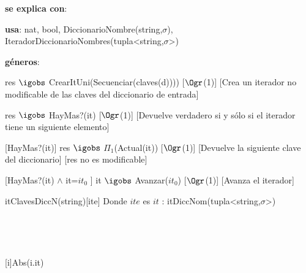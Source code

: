 \begin{Interfaz}

	\textbf{se explica con}: 
	
	\textbf{usa}: nat, bool, DiccionarioNombre(string,$\sigma$), IteradorDiccionarioNombres(tupla<string,$\sigma$>)
	
	\textbf{géneros}: 
	

	{res $\igobs$ CrearItUni(Secuenciar(claves(d))))}
	[$\Ogr$(1)]
	[Crea un iterador no modificable de las claves del diccionario  de entrada]
	
	
	{res $\igobs$ HayMas?(it)}
	[$\Ogr$(1)]
	[Devuelve verdadero si y sólo si el iterador tiene un siguiente elemento]
	
	[HayMas?(it)]
	{res $\igobs$ $\Pi_1$(Actual(it))}
	[$\Ogr$(1)]
	[Devuelve la siguiente clave del diccionario]
	[res no es modificable]
	
	[HayMas?(it) $\land$ it=$it_0$ ]
	{it $\igobs$ Avanzar($it_0$)}
	[$\Ogr$(1)]
	[Avanza el iterador]
	
	
\end{Interfaz}

\begin{Representacion}

	\begin{Estructura}{itClavesDiccN(string)}[ite]
		Donde $ite$ es $it$ : itDiccNom(tupla<string,$\sigma$>)
	\end{Estructura}
	
~
	
	
~

	{Abs(i.it)}
	

\end{Representacion}

